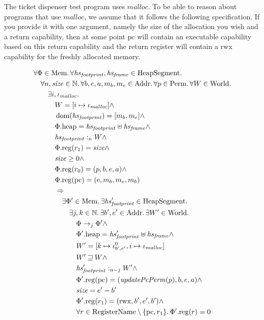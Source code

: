 \documentclass{article}
\DeclareMathOperator{\dom}{dom}
\newcommand{\var}[1]{\mathit{#1}}
\newcommand{\pcreg}{\mathrm{pc}}
\newcommand{\heap}{\var{heap}}
\newcommand{\plainproj}[1]{\mathrm{#1}}
\newcommand{\memheap}[1][\Phi]{#1.\plainproj{heap}}
\newcommand{\memreg}[1][\Phi]{#1.\plainproj{reg}}
\newcommand{\plainfun}[2]{
  \ifthenelse{\equal{#2}{}}
             {\mathit{#1}}
             {\mathit{#1}(#2)}
}
\newcommand{\updatePcPerm}[1]{\plainfun{updatePcPerm}{#1}}
\newcommand{\future}{\mathbin{\sqsupseteq}}
\newcommand{\heapSat}[3][\heap]{#1 :_{#2} #3}
\newcommand{\codelabel}[1]{\mathit{#1}}
\newcommand{\malloc}{\codelabel{malloc}}
\newcommand{\plaindom}[1]{\mathrm{#1}}
\newcommand{\Addrs}{\plaindom{Addr}}
\newcommand{\Mems}{\plaindom{Mem}}
\newcommand{\RegName}{\plaindom{RegisterName}}
\newcommand{\HeapSegments}{\plaindom{HeapSegment}}
\newcommand{\nats}{\mathbb{N}}
\newcommand{\Perms}{\plaindom{Perm}}
\newcommand{\Worlds}{\plaindom{World}}
\newcommand{\plainperm}[1]{\mathrm{#1}}
\newcommand{\entry}{\plainperm{e}}
\newcommand{\rwx}{\plainperm{rwx}}
\newcommand{\step}[1][]{\rightarrow_{#1}}
\begin{document}
The ticket dispenser test program uses $\malloc$. To be able to reason about programs that use $\malloc$, we assume that it follows the following specification. If you provide it with one argument, namely the size of the allocation you wish and a return capability, then at some point $\pcreg$ will contain an executable capability based on this return capability and the return register will contain a $\rwx$ capability for the freshly allocated memory. 
\begin{specification}[Malloc v.2]
  \begin{align*}
    &\forall \Phi \in \Mems \ldotp \forall \hsfoot, \hsframe \in \HeapSegments \ldotp \\
    &\quad \forall n, \size \in \nats \ldotp \forall b,e,a,m_b,m_e \in \Addrs\ldotp\forall p \in \Perms \ldotp \forall W \in \Worlds \ldotp\\
    &\qquad \exists i, \iota_{\malloc} \ldotp \\
    &\qquad \quad W = [i \mapsto \iota_{\malloc}] \land \\
    &\qquad \quad \dom(\hsfoot) = [m_b,m_e] \land \\ %
    &\qquad \quad \memheap = \hsfoot \uplus \hsframe \land\\
    &\qquad \quad \heapSat[\hsfoot]{n}{W} \land \\
    &\qquad \quad \memreg(r_1) = \size \land \\
    &\qquad \quad \size \geq 0 \land \\
    &\qquad \quad \memreg(r_0) = (p,b,e,a) \land \\
    &\qquad \quad \memreg(\pcreg) = (\entry,m_b,m_e,m_b) \\ %
    &\qquad \quad \Rightarrow \\
    &\qquad \qquad\exists \Phi' \in \Mems \ldotp \exists \hsfoot' \in \HeapSegments\ldotp\\
    &\qquad \qquad \quad \exists j,k \in \nats \ldotp \exists b',e'\in \Addrs \ldotp \exists W' \in \Worlds \ldotp \\
    &\qquad \qquad \qquad \Phi \step[j]\Phi' \land \\
    &\qquad \qquad \qquad \memheap[\Phi']=\hsfoot' \uplus \hsframe \land\\
    &\qquad \qquad \qquad W' = [k \mapsto \iota_{b',e'}^0, i \mapsto \iota_{\malloc}]\\
    &\qquad \qquad \qquad W' \future W \land \\
    &\qquad \qquad \qquad \heapSat[\hsfoot']{n-j}{W'} \land \\
    &\qquad \qquad \qquad \memreg[\Phi'](\pcreg) = (\updatePcPerm{p},b,e,a) \land \\
    &\qquad \qquad \qquad \size = e'-b' \\
    &\qquad \qquad \qquad \memreg[\Phi'](r_1) = (\rwx,b',e',b') \land \\
    &\qquad \qquad \qquad \forall r \in \RegName \setminus \{\pcreg,r_1\} \ldotp \memreg[\Phi'](r) = 0
  \end{align*}
\end{specification}
\end{document}
